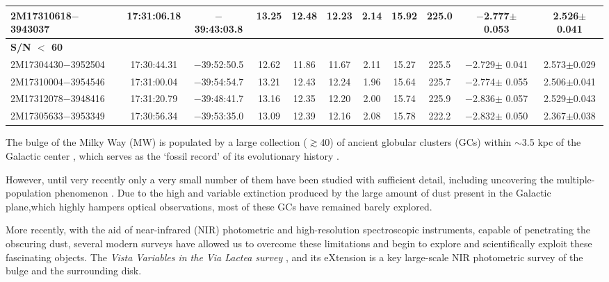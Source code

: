 \documentclass[longauth]{aa} %
\begin{document}
\begin{table*}
\begin{center}
\begin{tabular}{lcccccccccc}
			2M17310618$-$3943037 & 17:31:06.18 & $-$39:43:03.8 & 13.25 & 12.48 & 12.23 &  2.14 & 15.92 &  225.0 & $-$2.777$\pm$ 0.053  &  2.526$\pm$0.041 \\
			\hline
\hline
{\bf S/N $<$ 60} & & &  &  & 	 & & &  &  &  \\	
\hline
\hline
			2M17304430$-$3952504 & 17:30:44.31 & $-$39:52:50.5 & 12.62 & 11.86 & 11.67 &  2.11 & 15.27 &  225.5 & $-$2.729$\pm$ 0.041  &  2.573$\pm$0.029 \\
			2M17310004$-$3954546 & 17:31:00.04 & $-$39:54:54.7 & 13.21 & 12.43 & 12.24 &  1.96 & 15.64 &  225.7 & $-$2.774$\pm$ 0.055  &  2.506$\pm$0.041 \\
			2M17312078$-$3948416 & 17:31:20.79 & $-$39:48:41.7 & 13.16 & 12.35 & 12.20 &  2.00 & 15.74 &  225.9 & $-$2.836$\pm$ 0.057  &  2.529$\pm$0.043 \\
			2M17305633$-$3953349 & 17:30:56.34 & $-$39:53:35.0 & 13.09 & 12.39 & 12.16 &  2.08 & 15.78 &  222.2 & $-$2.832$\pm$ 0.050  &  2.367$\pm$0.038 \\
			\hline
			\hline
		\end{tabular}  \label{Table1a}
	\end{center}
\end{table*}   

The bulge of the Milky Way (MW) is populated by a large collection ($\gtrsim$40) of  ancient globular clusters (GCs) within $\sim$3.5 kpc of the Galactic center \citep[for a detailed description, see a review by][]{Bica2016, Barbuy2018, Perez-Villegas2020}, which serves as the `fossil record' of its evolutionary history \citep[][Minniti2021a]{Recio-Blanco2017, Minniti2018a, Kundu2019, Kundu2021,  FT_Subpopulation, FT_Chemodynamics, FT_Jurassic, FT_Alluminium,FT_Dynamics, FT_NGC6723, FT_Magellanic, FT_M54, Minniti2021a}.

However, until very recently only a very small number of them have been studied with sufficient detail, including uncovering the multiple-population phenomenon  \citep[][and references therein]{Cote1999, Minniti1995, Meszaros2020, FT_NGC6522,FT_UKS1, FT_NGC6723, FT_VVCL001, Geisler2021}. Due to the high and variable extinction produced by the large amount of dust present in the Galactic plane,which highly hampers optical observations, most of these GCs have remained barely explored.

More recently, with the aid of near-infrared (NIR) photometric and high-resolution spectroscopic instruments, capable of penetrating the obscuring dust, several modern surveys have allowed us to overcome these limitations and begin to explore and scientifically exploit these fascinating objects. The \textit{Vista Variables in the Via Lactea survey} \citep[VVV:][]{Minniti2010, Saito2012, Alonso2018}, and its eXtension \citep[VVVX:][]{Minniti2018} is a key large-scale NIR photometric survey of the bulge and the surrounding disk. 
\end{document}
